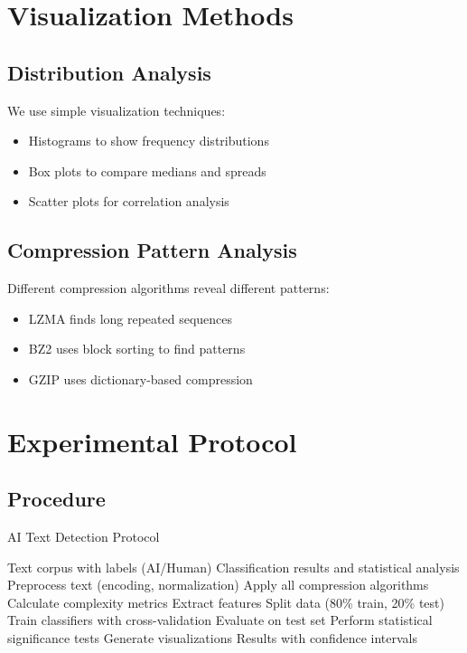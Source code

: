 \documentclass[12pt,a4paper]{report}
\begin{document}
\section{Visualization Methods}

\subsection{Distribution Analysis}

We use simple visualization techniques:
\begin{itemize}
    \item Histograms to show frequency distributions
    \item Box plots to compare medians and spreads
    \item Scatter plots for correlation analysis
\end{itemize}

\subsection{Compression Pattern Analysis}

Different compression algorithms reveal different patterns:
\begin{itemize}
    \item LZMA finds long repeated sequences
    \item BZ2 uses block sorting to find patterns
    \item GZIP uses dictionary-based compression
\end{itemize}

\section{Experimental Protocol}

\subsection{Procedure}

\begin{algorithm}
\caption{AI Text Detection Protocol}
\begin{algorithmic}[1]
\REQUIRE Text corpus with labels (AI/Human)
\ENSURE Classification results and statistical analysis
    \STATE Preprocess text (encoding, normalization)
    \STATE Apply all compression algorithms
    \STATE Calculate complexity metrics
    \STATE Extract features
\ENDFOR
\STATE Split data (80\% train, 20\% test)
\STATE Train classifiers with cross-validation
\STATE Evaluate on test set
\STATE Perform statistical significance tests
\STATE Generate visualizations
\RETURN Results with confidence intervals
\end{algorithmic}
\end{algorithm}
\end{document}

